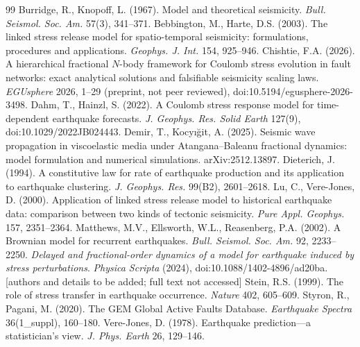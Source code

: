 \documentclass[10pt,a4paper]{article}
\begin{document}
\begin{thebibliography}{99}\small
{} Burridge, R., Knopoff, L. (1967). Model and theoretical seismicity. \emph{Bull. Seismol. Soc. Am.} 57(3), 341--371.
 Bebbington, M., Harte, D.S. (2003). The linked stress release model for spatio-temporal seismicity: formulations, procedures and applications. \emph{Geophys. J. Int.} 154, 925--946.
 Chishtie, F.A. (2026). A hierarchical fractional $N$-body framework for Coulomb stress evolution in fault networks: exact analytical solutions and falsifiable seismicity scaling laws. \emph{EGUsphere} 2026, 1--29 (preprint, not peer reviewed), doi:10.5194/egusphere-2026-3498.
 Dahm, T., Hainzl, S. (2022). A Coulomb stress response model for time-dependent earthquake forecasts. \emph{J. Geophys. Res. Solid Earth} 127(9), doi:10.1029/2022JB024443.
 Demir, T., Kocy{\i}{\u g}it, A. (2025). Seismic wave propagation in viscoelastic media under Atangana--Baleanu fractional dynamics: model formulation and numerical simulations. arXiv:2512.13897.
 Dieterich, J. (1994). A constitutive law for rate of earthquake production and its application to earthquake clustering. \emph{J. Geophys. Res.} 99(B2), 2601--2618.
 Lu, C., Vere-Jones, D. (2000). Application of linked stress release model to historical earthquake data: comparison between two kinds of tectonic seismicity. \emph{Pure Appl. Geophys.} 157, 2351--2364.
 Matthews, M.V., Ellsworth, W.L., Reasenberg, P.A. (2002). A Brownian model for recurrent earthquakes. \emph{Bull. Seismol. Soc. Am.} 92, 2233--2250.
 \emph{Delayed and fractional-order dynamics of a model for earthquake induced by stress perturbations}. \emph{Physica Scripta} (2024), doi:10.1088/1402-4896/ad20ba. [authors and details to be added; full text not accessed]
 Stein, R.S. (1999). The role of stress transfer in earthquake occurrence. \emph{Nature} 402, 605--609.
 Styron, R., Pagani, M. (2020). The GEM Global Active Faults Database. \emph{Earthquake Spectra} 36(1\_suppl), 160--180.
 Vere-Jones, D. (1978). Earthquake prediction---a statistician's view. \emph{J. Phys. Earth} 26, 129--146.

\end{thebibliography}
\end{document}
